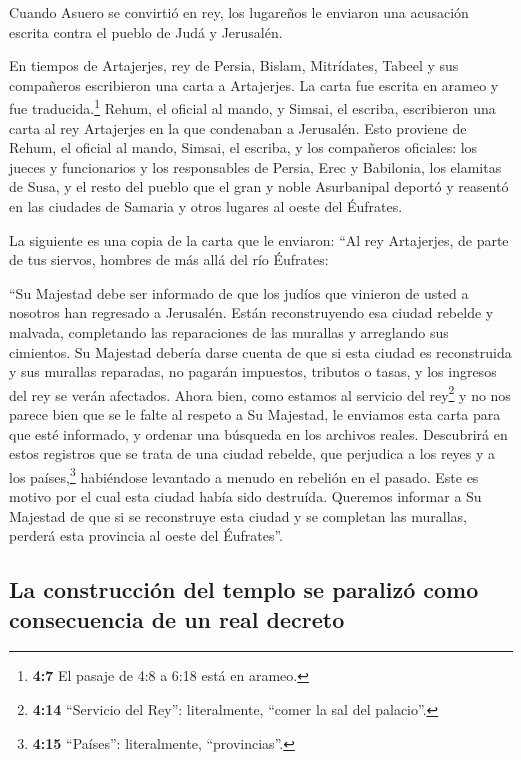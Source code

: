  Cuando Asuero se convirtió en rey, los lugareños le
enviaron una acusación escrita contra el pueblo de Judá y Jerusalén.

 En tiempos de Artajerjes, rey de Persia, Bislam,
Mitrídates, Tabeel y sus compañeros escribieron una carta a Artajerjes.
La carta fue escrita en arameo y fue traducida.\footnote{\textbf{4:7} El
  pasaje de 4:8 a 6:18 está en arameo.}  Rehum, el oficial
al mando, y Simsai, el escriba, escribieron una carta al rey Artajerjes
en la que condenaban a Jerusalén.  Esto proviene de Rehum,
el oficial al mando, Simsai, el escriba, y los compañeros oficiales: los
jueces y funcionarios y los responsables de Persia, Erec y Babilonia,
los elamitas de Susa,  y el resto del pueblo que el gran
y noble Asurbanipal deportó y reasentó en las ciudades de Samaria y
otros lugares al oeste del Éufrates.

 La siguiente es una copia de la carta que le enviaron:
``Al rey Artajerjes, de parte de tus siervos, hombres de más allá del
río Éufrates:

 ``Su Majestad debe ser informado de que los judíos que
vinieron de usted a nosotros han regresado a Jerusalén. Están
reconstruyendo esa ciudad rebelde y malvada, completando las
reparaciones de las murallas y arreglando sus cimientos. 
Su Majestad debería darse cuenta de que si esta ciudad es reconstruida y
sus murallas reparadas, no pagarán impuestos, tributos o tasas, y los
ingresos del rey se verán afectados.  Ahora bien, como
estamos al servicio del rey\footnote{\textbf{4:14} ``Servicio del Rey'':
  literalmente, ``comer la sal del palacio''.} y no nos parece bien que
se le falte al respeto a Su Majestad, le enviamos esta carta para que
esté informado,  y ordenar una búsqueda en los archivos
reales. Descubrirá en estos registros que se trata de una ciudad
rebelde, que perjudica a los reyes y a los países,\footnote{\textbf{4:15}
  ``Países'': literalmente, ``provincias''.} habiéndose levantado a
menudo en rebelión en el pasado. Este es motivo por el cual esta ciudad
había sido destruída.  Queremos informar a Su Majestad de
que si se reconstruye esta ciudad y se completan las murallas, perderá
esta provincia al oeste del Éufrates''.

\hypertarget{la-construcciuxf3n-del-templo-se-paralizuxf3-como-consecuencia-de-un-real-decreto}{%
\subsection{La construcción del templo se paralizó como consecuencia de
un real
decreto}\label{la-construcciuxf3n-del-templo-se-paralizuxf3-como-consecuencia-de-un-real-decreto}}


